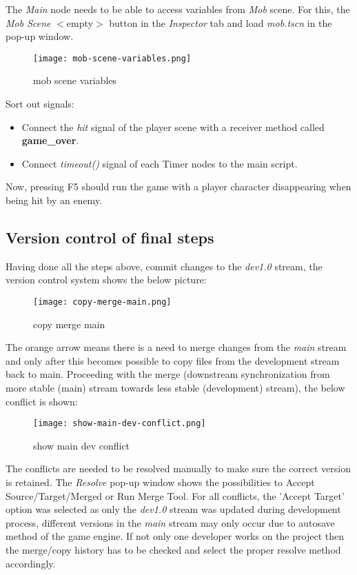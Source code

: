 The \textit{Main} node needs to be able to access variables from \textit{Mob} scene. For this, the 
\textit{Mob Scene} {$<$}empty{$>$} button in the \textit{Inspector} tab and load \textit{mob.tscn} in the pop-up window.
\begin{figure}[H]
    \centering
    \texttt{[image: mob-scene-variables.png]}
    \caption{mob scene variables}
    \label{fig:mob-scene-variables}
\end{figure}
Sort out signals:
\begin{itemize}
    \item Connect the \textit{hit} signal of the player scene with a receiver method called \textbf{game\_over}.
    \item Connect \textit{timeout()} signal of each Timer nodes to the main script.
\end{itemize}
Now, pressing F5 should run the game with a player character disappearing when being hit by an enemy.

\subsection{Version control of final steps}
Having done all the steps above, commit changes to the \textit{dev1.0} stream, the version control system shows the below
picture: \hfill \break
\begin{figure}[H]
    \centering
    \texttt{[image: copy-merge-main.png]}
    \caption{copy merge main}
    \label{fig:copy-merge-main}
\end{figure}
The orange arrow means there is a need to merge changes from the \textit{main} stream and only after this becomes possible 
to copy files from the development stream back to main. \hfill \break
Proceeding with the merge (downstream synchronization from more stable (main) stream towards less stable (development)
stream), the below conflict is shown:
\begin{figure}[H]
    \centering
    \texttt{[image: show-main-dev-conflict.png]}
    \caption{show main dev conflict}
    \label{fig:show-main-dev-conflict}
\end{figure}
The conflicts are needed to be resolved manually to make sure the correct version is retained. The \textit{Resolve} pop-up
window shows the possibilities to Accept Source/Target/Merged or Run Merge Tool. For all conflicts, the 'Accept Target'
option was selected as only the \textit{dev1.0} stream was updated during development process, different versions in the 
\textit{main} stream may only occur due to autosave method of the game engine. If not only one developer works on the project
then the merge/copy history has to be checked and select the proper resolve method accordingly.

